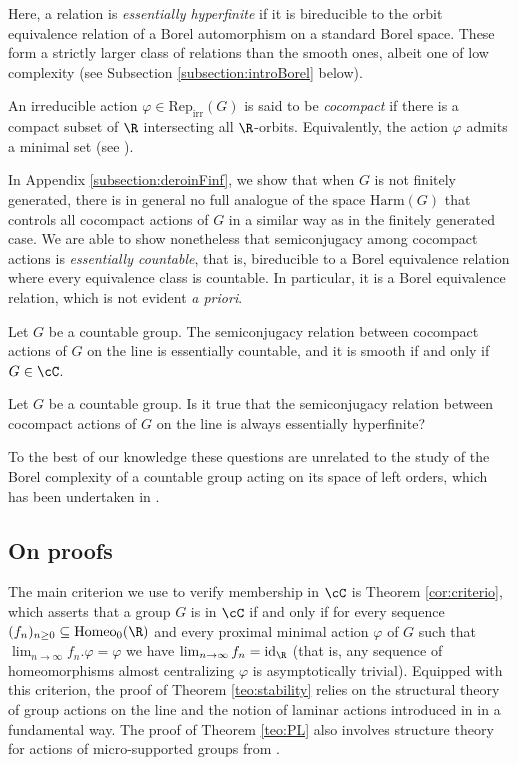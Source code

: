 \documentclass[reqno]{amsart}
\begin{document}
Here, a relation is \emph{essentially hyperfinite} if it is bireducible to the orbit equivalence relation of a Borel automorphism on a standard Borel space. These form a strictly larger class of relations than the smooth ones, albeit one of low complexity (see Subsection \ref{subsection:introBorel} below).

An irreducible action $\varphi \in \mathrm{Rep}_\mathrm{irr}(G)$ is said to be \emph{cocompact} if there is a compact subset of $\R$ intersecting all $\R$-orbits. Equivalently, the action $\varphi$ admits a minimal set (see \cite[Proposition 2.1.2]{Navas2011}). 

In Appendix \ref{subsection:deroinFinf}, we show that when $G$ is not finitely generated, there is in general no full analogue of the space $\mathrm{Harm}(G)$ that controls all cocompact actions of $G$ in a similar way as in the finitely generated case. We are able to show nonetheless that semiconjugacy among cocompact actions is \emph{essentially countable}, that is, bireducible to a Borel equivalence relation where every equivalence class is countable. In particular, it is a Borel equivalence relation, which is not evident \emph{a priori}.
\begin{thmA} \label{teo:complexity}
	Let $G$ be a countable group. The semiconjugacy relation between cocompact actions of $G$ on the line is essentially countable, and it is smooth if and only if $G \in \cC$.
\end{thmA}

\begin{qnnum}
Let $G$ be a countable group. Is it true that the semiconjugacy relation between cocompact actions of $G$ on the line  is always essentially hyperfinite?
\end{qnnum}

To the best of our knowledge these questions are unrelated to the study of the Borel complexity of a countable group acting on its space of left orders, which has been undertaken in \cite{CalderoniClay2024}.

\subsection{On proofs} The main criterion we use to verify membership in $\cC$ is Theorem \ref{cor:criterio}, which asserts that a group $G$ is in $\cC$ if and only if for every sequence $(f_n)_{n \geq 0} \subseteq \mathrm{Homeo}_0(\R)$ and every proximal minimal action $\varphi$ of $G$ such that $\lim_{n \to \infty} f_n.\varphi = \varphi$ we have $\lim_{n \to \infty} f_n = \mathrm{id}_\R$ (that is, any sequence of homeomorphisms almost centralizing $\varphi$ is asymptotically trivial). Equipped with this criterion, the proof of Theorem \ref{teo:stability} relies on the structural theory of group actions on the line and the notion of laminar actions introduced in \cite[Chapter 8]{BMRT} in a fundamental way. The proof of Theorem \ref{teo:PL} also involves structure theory for actions of micro-supported groups from \cite[Chapter 9]{BMRT}.
\end{document}
